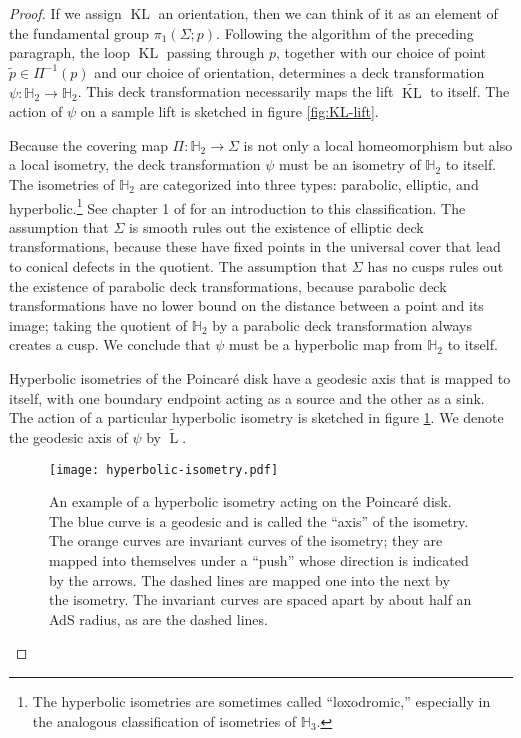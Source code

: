 \documentclass[a4paper,11pt]{article}
\renewcommand{\tilde}{\widetilde}
\newcommand{\KL}{\operatorname{KL}}
\renewcommand{\L}{\operatorname{L}}
\begin{document}
\begin{proof}
    If we assign $\KL$ an orientation, then we can think of it as an element of the fundamental group $\pi_{1}(\Sigma; p).$ Following the algorithm of the preceding paragraph, the loop $\KL$ passing through $p$, together with our choice of point $\tilde{p} \in \Pi^{-1}(p)$ and our choice of orientation, determines a deck transformation $\psi : \mathbb{H}_2 \rightarrow \mathbb{H}_{2}$. This deck transformation necessarily maps the lift $\tilde{\KL}$ to itself. The action of $\psi$ on a sample lift is sketched in figure \ref{fig:KL-lift}.
    
    Because the covering map $\Pi : \mathbb{H}_{2} \rightarrow \Sigma$ is not only a local homeomorphism but also a local isometry, the deck transformation $\psi$ must be an isometry of $\mathbb{H}_{2}$ to itself. The isometries of $\mathbb{H}_{2}$ are categorized into three types: parabolic, elliptic, and hyperbolic.\footnote{The hyperbolic isometries are sometimes called ``loxodromic,'' especially in the analogous classification of isometries of $\mathbb{H}_{3}.$} See chapter 1 of \cite{marden2007outer} for an introduction to this classification. The assumption that $\Sigma$ is smooth rules out the existence of elliptic deck transformations, because these have fixed points in the universal cover that lead to conical defects in the quotient. The assumption that $\Sigma$ has no cusps rules out the existence of parabolic deck transformations, because parabolic deck transformations have no lower bound on the distance between a point and its image; taking the quotient of $\mathbb{H}_{2}$ by a parabolic deck transformation always creates a cusp. We conclude that $\psi$ must be a hyperbolic map from $\mathbb{H}_{2}$ to itself.

    Hyperbolic isometries of the Poincar\'{e} disk have a geodesic axis that is mapped to itself, with one boundary endpoint acting as a source and the other as a sink. The action of a particular hyperbolic isometry is sketched in figure \ref{fig:hyperbolic-isometry}. We denote the geodesic axis of $\psi$ by $\tilde{\L}.$
    
    \begin{figure}
        \centering
        \texttt{[image: hyperbolic-isometry.pdf]}
        \caption{An example of a hyperbolic isometry acting on the Poincar\'{e} disk. The blue curve is a geodesic and is called the ``axis'' of the isometry. The orange curves are invariant curves of the isometry; they are mapped into themselves under a ``push'' whose direction is indicated by the arrows. The dashed lines are mapped one into the next by the isometry. The invariant curves are spaced apart by about half an AdS radius, as are the dashed lines.}
        \label{fig:hyperbolic-isometry}
    \end{figure}
    

\end{proof}
\end{document}
